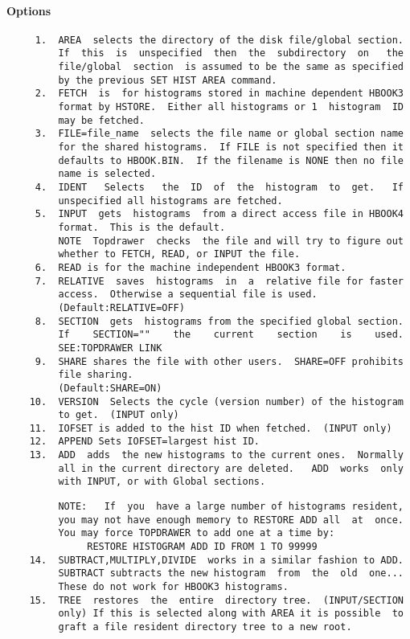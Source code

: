 \paragraph{Options}
\begin{verbatim}
     1.  AREA  selects the directory of the disk file/global section.
         If  this  is  unspecified  then  the  subdirectory  on   the
         file/global  section  is assumed to be the same as specified
         by the previous SET HIST AREA command.  
     2.  FETCH  is  for histograms stored in machine dependent HBOOK3
         format by HSTORE.  Either all histograms or 1  histogram  ID
         may be fetched.  
     3.  FILE=file_name  selects the file name or global section name
         for the shared histograms.  If FILE is not specified then it
         defaults to HBOOK.BIN.  If the filename is NONE then no file
         name is selected.  
     4.  IDENT   Selects   the  ID  of  the  histogram  to  get.   If
         unspecified all histograms are fetched.  
     5.  INPUT  gets  histograms  from a direct access file in HBOOK4
         format.  This is the default.  
         NOTE  Topdrawer  checks  the file and will try to figure out
         whether to FETCH, READ, or INPUT the file.  
     6.  READ is for the machine independent HBOOK3 format.  
     7.  RELATIVE  saves  histograms  in  a  relative file for faster
         access.  Otherwise a sequential file is used.  
         (Default:RELATIVE=OFF) 
     8.  SECTION  gets  histograms from the specified global section.
         If    SECTION=""    the    current    section    is    used.
         SEE:TOPDRAWER LINK 
     9.  SHARE shares the file with other users.  SHARE=OFF prohibits
         file sharing.  
         (Default:SHARE=ON) 
    10.  VERSION  Selects the cycle (version number) of the histogram
         to get.  (INPUT only) 
    11.  IOFSET is added to the hist ID when fetched.  (INPUT only) 
    12.  APPEND Sets IOFSET=largest hist ID.  
    13.  ADD  adds  the new histograms to the current ones.  Normally
         all in the current directory are deleted.   ADD  works  only
         with INPUT, or with Global sections.  
\end{verbatim}

\begin{verbatim}
         NOTE:   If  you  have a large number of histograms resident,
         you may not have enough memory to RESTORE ADD all  at  once.
         You may force TOPDRAWER to add one at a time by:  
              RESTORE HISTOGRAM ADD ID FROM 1 TO 99999 
    14.  SUBTRACT,MULTIPLY,DIVIDE  works in a similar fashion to ADD.
         SUBTRACT subtracts the new histogram  from  the  old  one...
         These do not work for HBOOK3 histograms.  
    15.  TREE  restores  the  entire  directory tree.  (INPUT/SECTION
         only) If this is selected along with AREA it is possible  to
         graft a file resident directory tree to a new root.  
\end{verbatim}
